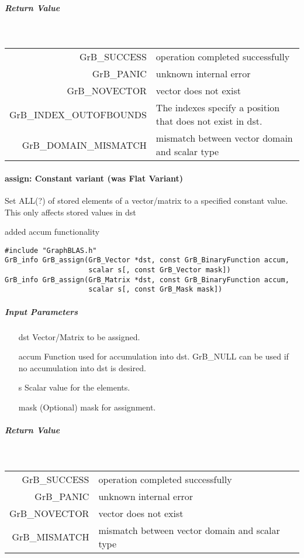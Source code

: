 \subparagraph{Return Value}~

\begin{tabular}{rl}
{\sf GrB\_SUCCESS}	& operation completed successfully \\
{\sf GrB\_PANIC}	& unknown internal error \\
{\sf GrB\_NOVECTOR}	& vector does not exist \\
{\sf GrB\_INDEX\_OUTOFBOUNDS} & The indexes specify a position that does not exist in dst. \\
{\sf GrB\_DOMAIN\_MISMATCH}	& mismatch between vector domain and scalar type \\
\end{tabular}

\paragraph{{\sf assign}: Constant variant (was Flat Variant)}

Set ALL(?) of stored elements of a vector/matrix to a specified constant value.
This only affects stored values in dst

{\scott added accum functionality}

\begin{verbatim}
#include "GraphBLAS.h"
GrB_info GrB_assign(GrB_Vector *dst, const GrB_BinaryFunction accum,
                    scalar s[, const GrB_Vector mask])
GrB_info GrB_assign(GrB_Matrix *dst, const GrB_BinaryFunction accum,
                    scalar s[, const GrB_Mask mask])
\end{verbatim}

\subparagraph{Input Parameters}

\begin{itemize}
	\item[{\sf dst}]   Vector/Matrix to be assigned.
	\item[{\sf accum}] Function used for accumulation into dst.  {\sf GrB\_NULL}
                       can be used if no accumulation into dst is desired.
	\item[{\sf s}]     Scalar value for the elements.
	\item[{\sf mask}]  (Optional) mask for assignment.  
\end{itemize}

\subparagraph{Return Value}~

\begin{tabular}{rl}
{\sf GrB\_SUCCESS}	& operation completed successfully \\
{\sf GrB\_PANIC}	& unknown internal error \\
{\sf GrB\_NOVECTOR}	& vector does not exist \\
{\sf GrB\_MISMATCH}	& mismatch between vector domain and scalar type \\
\end{tabular}
